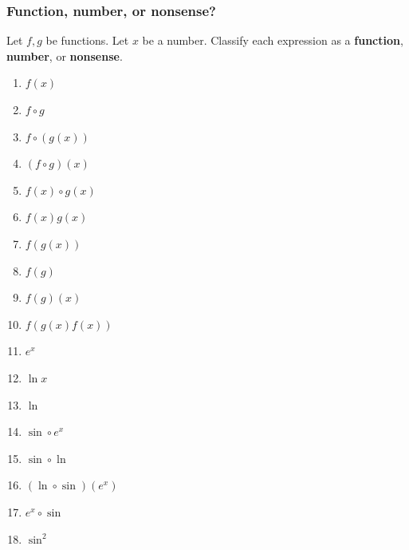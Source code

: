 \documentclass[14pt]{beamer}
\begin{document}
\begin{frame}[t]
\frametitle{Function, number, or nonsense?}

Let $f,g$ be functions. Let $x$ be a number. Classify each
	expression as a \textbf{function}, \textbf{number}, or \textbf{nonsense}.


\begin{multicols}{2}
	\begin{enumerate}
		\item $f(x)$
		\item $f\circ g$
		\item $f\circ (g(x))$
		\item $(f\circ g)(x)$
		\item $f(x)\circ g(x)$
		\item $f(x)g(x)$
		\item $f(g(x))$
		\item $f(g)$
		\item $f(g)(x)$
		\item $f(g(x)f(x))$
		\item $e^x$
		\item $\ln x$
		\item $\ln$
		\item $\sin \circ e^x$
		\item $\sin \circ \ln$
		\item $(\ln\circ \sin)(e^x)$
		\item $e^x\circ \sin$
		\item $\sin^2$
	\end{enumerate}
\end{multicols}


\end{frame}
\end{document}
